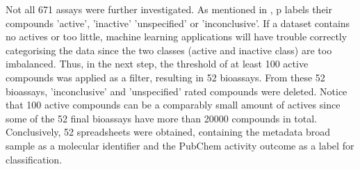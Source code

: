 Not all \num{671} assays were further investigated. As mentioned in , \acl{p} labels their compounds 'active', 'inactive' 'unspecified' or 'inconclusive'. If a dataset contains no actives or too little, machine learning applications will have trouble correctly categorising the data since the two classes (active and inactive class) are too imbalanced. Thus, in the next step, the threshold of at least \num{100} active compounds was applied as a filter, resulting in \num{52} bioassays. From these \num{52} bioassays, 'inconclusive' and 'unspecified' rated compounds were deleted. Notice that \num{100} active compounds can be a comparably small amount of actives since some of the \num{52} final bioassays have more than \num{20000} compounds in total.\\
Conclusively, \num{52} spreadsheets were obtained, containing the metadata broad sample as a molecular identifier and the PubChem activity outcome as a label for classification.
%
%
